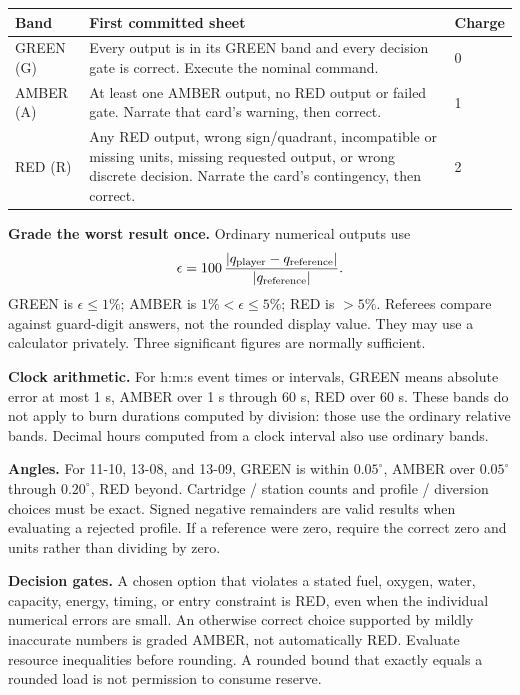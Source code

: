 \documentclass[11pt]{article}
\begin{document}
\begin{center}
\begin{tabularx}{\linewidth}{@{}lXl@{}}
\toprule
Band & First committed sheet & Charge\\
\midrule
GREEN (G) & Every output is in its GREEN band and every decision gate
is correct. Execute the nominal command. & 0\\
AMBER (A) & At least one AMBER output, no RED output or failed gate.
Narrate that card's warning, then correct. & 1\\
RED (R) & Any RED output, wrong sign/quadrant, incompatible or missing
units, missing requested output, or wrong discrete decision.
Narrate the card's contingency, then correct. & 2\\
\bottomrule
\end{tabularx}
\end{center}

\textbf{Grade the worst result once.} Ordinary numerical outputs use
\[
\epsilon=100\,\frac{|q_{\rm player}-q_{\rm reference}|}
{|q_{\rm reference}|}.
\]
GREEN is \(\epsilon\leq1\%\); AMBER is \(1\%<\epsilon\leq5\%\);
RED is \(>5\%\). Referees compare against guard-digit answers, not
the rounded display value. They may use a calculator privately.
Three significant figures are normally sufficient.

\textbf{Clock arithmetic.} For h:m:s event times or intervals, GREEN
means absolute error at most 1 s, AMBER over 1 s through 60 s,
RED over 60 s. These bands do not apply to burn durations computed by
division: those use the ordinary relative bands. Decimal hours computed
from a clock interval also use ordinary bands.

\textbf{Angles.} For 11-10, 13-08, and 13-09, GREEN is within
\(0.05^\circ\), AMBER over \(0.05^\circ\) through \(0.20^\circ\),
RED beyond. Cartridge / station counts and profile / diversion choices
must be exact. Signed negative remainders are valid results when
evaluating a rejected profile. If a reference were zero, require the
correct zero and units rather than dividing by zero.

\textbf{Decision gates.} A chosen option that violates a stated fuel,
oxygen, water, capacity, energy, timing, or entry constraint is RED,
even when the individual numerical errors are small. An otherwise
correct choice supported by mildly inaccurate numbers is graded
AMBER, not automatically RED. Evaluate resource inequalities before
rounding. A rounded bound that exactly equals a rounded load is not
permission to consume reserve.
\end{document}
